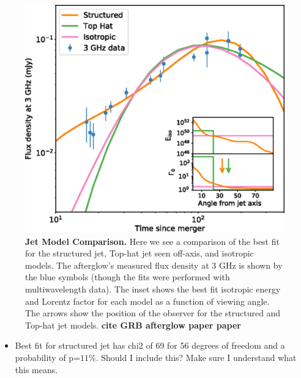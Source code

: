 \documentclass[11pt]{cuthesis}
\begin{document}
\begin{figure} %
\begin{center}
\includegraphics[width=1.0\linewidth]{grb_model_comparison.png}
\end{center}
\caption{\textbf{Jet Model Comparison.} Here we see a comparison of the best fit for the structured jet, Top-hat jet seen off-axis, and isotropic models. The afterglow's measured flux density at 3 GHz is shown by the blue symbols (though the fits were performed with multiwavelength data). The inset shows the best fit isotropic energy and Lorentz factor for each model as a function of viewing angle. The arrows show the position of the observer for the structured and Top-hat jet models. \textbf{cite GRB afterglow paper paper} }
\label{fig:model comparison}
\end{figure}

\begin{itemize}
\item Best fit for structured jet has chi2 of 69 for 56 degrees of freedom and a probability of p=$11\%$. Should I include this? Make sure I understand what this means.
\end{itemize}
\end{document}
